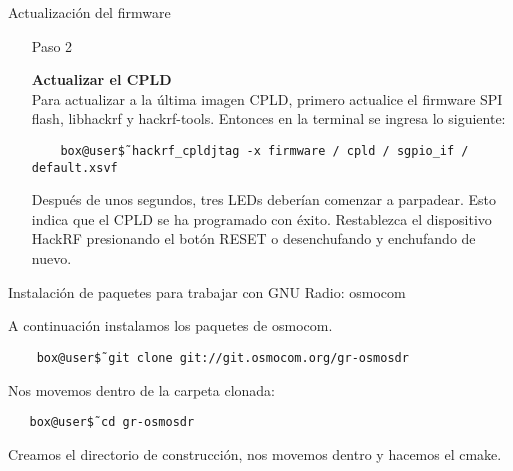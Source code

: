 \begin{frame}{Actualización del firmware}

\begin{itemize}
    \item [Paso 2]
    {\textbf {Actualizar el CPLD}\\ Para actualizar a la última imagen CPLD, primero actualice el firmware SPI flash, libhackrf y hackrf-tools. Entonces en la terminal se ingresa lo siguiente:
    
    \begin{block}{}
    \texttt{
    ~~~box@user\~\$ hackrf\_cpldjtag -x firmware / cpld / sgpio\_if / default.xsvf}
    \end{block}
    
    Después de unos segundos, tres LEDs deberían comenzar a parpadear. Esto indica que el CPLD se ha programado con éxito. Restablezca el dispositivo HackRF presionando el botón RESET o desenchufando y enchufando de nuevo.
    }
    
\end{itemize}
\end{frame}

\begin{frame}{Instalación de paquetes para trabajar con GNU Radio: osmocom}

A continuación instalamos los paquetes de osmocom.

\begin{block}{}
    \texttt{
    ~~~box@user\~\$ git clone git://git.osmocom.org/gr-osmosdr}
\end{block}

Nos movemos dentro de la carpeta clonada:

\begin{block}{}
    \texttt
    {~~~box@user\~\$ cd gr-osmosdr}
\end{block}


Creamos el directorio de construcción, nos movemos dentro y hacemos el cmake.

\end{frame}

